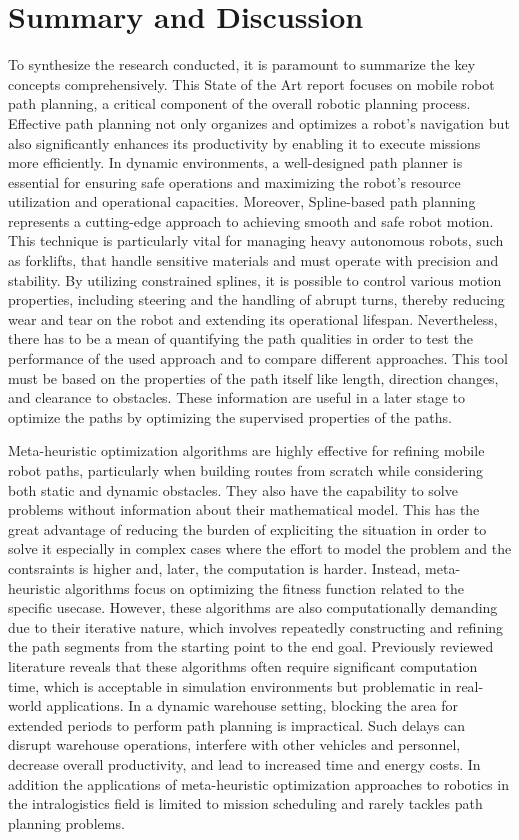 \section{Summary and Discussion}
To synthesize the research conducted, it is paramount to summarize the key concepts comprehensively. This 
State of the Art report focuses on mobile robot path planning, a critical component of the overall 
robotic planning process. Effective path planning not only organizes and optimizes a robot's navigation 
but also significantly enhances its productivity by enabling it to execute missions more efficiently. 
In dynamic environments, a well-designed path planner is essential for ensuring safe operations and 
maximizing the robot's resource utilization and operational capacities. Moreover, Spline-based path planning represents a cutting-edge approach to achieving smooth and safe 
robot motion. This technique is particularly vital for managing heavy autonomous robots, such as 
forklifts, that handle sensitive materials and must operate with precision and stability. By utilizing 
constrained splines, it is possible to control various motion properties, including steering and 
the handling of abrupt turns, thereby reducing wear and tear on the robot and extending its operational 
lifespan. Nevertheless, there has to be a mean of quantifying the path qualities in order to test the 
performance of the used approach and to compare different approaches. This tool must be based on the 
properties of the path itself like length, direction changes, and clearance to obstacles.
These information are useful in a later stage to optimize the paths by optimizing the supervised 
properties of the paths. 

Meta-heuristic optimization algorithms are highly effective for refining mobile robot paths, particularly 
when building routes from scratch while considering both static and dynamic obstacles.
They also have the capability to solve problems without information about their mathematical model.
This has the great advantage of reducing the burden of expliciting the situation in order to solve it especially 
in complex cases where the effort to model the problem and the contsraints is higher and, later, the computation 
is harder. Instead, meta-heuristic algorithms focus on optimizing the fitness function related to the specific 
usecase. However, these algorithms are 
also computationally demanding due to their iterative nature, which involves repeatedly constructing and refining the path 
segments from the starting point to the end goal. Previously reviewed literature reveals that these algorithms often 
require significant computation 
time, which is acceptable in simulation environments but problematic in real-world applications. In a dynamic warehouse 
setting, blocking the area for extended periods to perform path planning is impractical. Such delays can disrupt 
warehouse operations, interfere with other vehicles and personnel, decrease overall productivity, and lead to 
increased time and energy costs. In addition the applications of meta-heuristic optimization approaches to robotics
in the intralogistics field is limited to mission scheduling and rarely tackles path planning problems.

